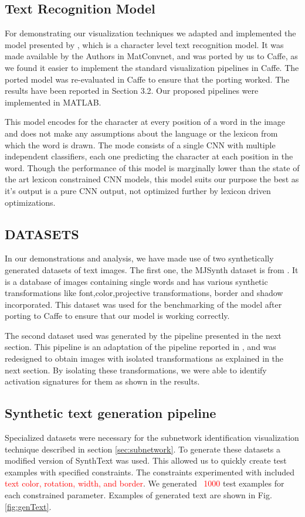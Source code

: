 \documentclass[10pt,twocolumn,letterpaper]{article}
\begin{document}
\subsection{Text Recognition Model}
For demonstrating our visualization techniques we adapted and implemented the model presented by \cite{Jaderberg14c}, which is a character level text recognition model. It was made available by the Authors in MatConvnet, and was ported by us to Caffe, as we found it easier to implement the standard visualization pipelines in Caffe. The ported model was re-evaluated in Caffe to ensure that the porting worked. The results have been reported in Section 3.2. Our proposed pipelines were implemented in MATLAB.

This  model encodes for the character at every position of a word in the image and does not make any assumptions about the language or the lexicon from which the word is drawn. The  mode consists of a single CNN with multiple independent classifiers, each one predicting the character at each position in the word. Though the performance of this model is marginally lower than the state of the art lexicon constrained CNN models, this model suits our purpose the best as it's output is a pure CNN output, not optimized further by lexicon driven optimizations.  

\subsection{DATASETS}
In our demonstrations and analysis, we have made use of two synthetically generated datasets of text images. The first one, the MJSynth dataset is from \cite{Jaderberg14c}. It is a database of images containing single words and has various synthetic transformations like font,color,projective transformations, border and shadow incorporated. This dataset was used for the benchmarking of the model after porting to Caffe to ensure that our model is working correctly. 

The second dataset used was generated by the pipeline presented in the next section. This pipeline is an adaptation of the pipeline reported in \cite{Gupta16}, and was redesigned to obtain images with isolated transformations as explained in the next section. By isolating these transformations, we were able to identify activation signatures for them as shown in the results. 

\subsection{Synthetic text generation pipeline} \label{sec:synthtext}
Specialized datasets were necessary for the subnetwork identification visualization technique described in section \ref{sec:subnetwork}.
To generate these datasets a modified version of SynthText \cite{Gupta16} was used. This allowed us to quickly create test examples with specified constraints. The constraints experimented with included \textcolor{red}{text color, rotation, width, and border}. We generated \textcolor{red}{~1000} test examples for each constrained parameter. Examples of generated text are shown in Fig. \ref{fig:genText}.
\end{document}
